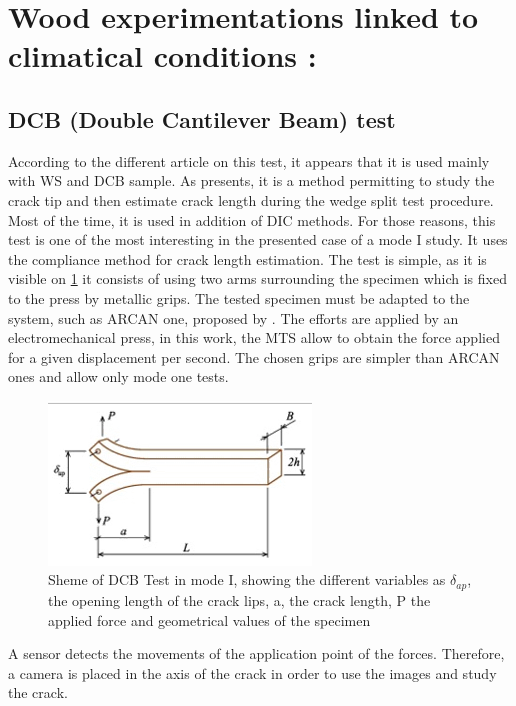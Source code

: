 \section{Wood experimentations linked to climatical conditions :}


\subsection{DCB (Double Cantilever Beam) test}

According to the different article on this test, it appears that it is used mainly with WS and DCB sample. As \parencite{Reference11} presents, it is a method permitting to study the crack tip and then estimate crack length during the wedge split test procedure. Most of the time, it is used in addition of DIC methods. For those reasons, this test is one of the most interesting in the presented case of a mode I study. It uses the compliance method for crack length estimation. 
The test is simple, as it is visible on \ref{fig:Fig6} it consists of using two arms surrounding the specimen which is fixed to the press by metallic grips. The tested specimen must be adapted to the system, such as ARCAN one, proposed by \parencite{Reference6}. The efforts are applied by an electromechanical press, in this work, the MTS allow to obtain the force applied for a given displacement per second. The chosen grips are simpler than ARCAN ones and allow only mode one tests.
\begin{figure}[th]
	\centering
	\includegraphics{Figures/DCB Test}
	\decoRule
	\caption[DCB Test]{Sheme of DCB Test in mode I, showing the different variables as $\delta_{ap}$, the opening length of the crack lips, a, the crack length, P the applied force and geometrical values of the specimen}
	\label{fig:Fig6}
\end{figure}
A sensor detects the movements of the application point of the forces.
Therefore, a camera is placed in the axis of the crack in order to use the images and study the crack.


